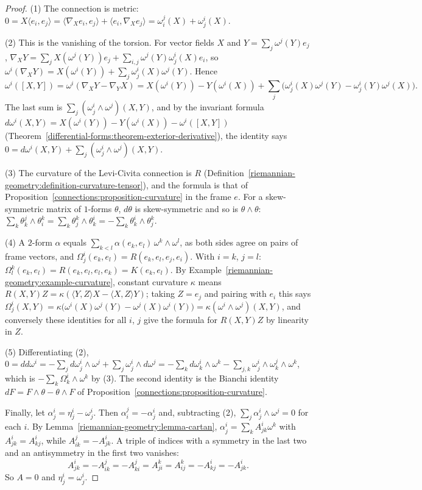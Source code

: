 \begin{proof}
(1) The connection is metric: $0 = X\langle e_i, e_j\rangle = \langle\nabla_Xe_i, e_j\rangle + \langle e_i, \nabla_Xe_j\rangle = \omega^j_i(X) + \omega^i_j(X)$.

(2) This is the vanishing of the torsion. For vector fields $X$ and $Y = \sum_j\omega^j(Y)e_j$,
$\nabla_XY = \sum_jX(\omega^j(Y))e_j + \sum_{i,j}\omega^j(Y)\omega^i_j(X)e_i$, so $\omega^i(\nabla_XY) = X(\omega^i(Y)) + \sum_j\omega^i_j(X)\omega^j(Y)$. Hence
\[
\omega^i([X, Y]) = \omega^i(\nabla_XY - \nabla_YX) = X(\omega^i(Y)) - Y(\omega^i(X)) + \sum_j\bigl(\omega^i_j(X)\omega^j(Y) - \omega^i_j(Y)\omega^j(X)\bigr).
\]
The last sum is $\sum_j(\omega^i_j \wedge \omega^j)(X, Y)$, and by the invariant formula $d\omega^i(X, Y) = X(\omega^i(Y)) - Y(\omega^i(X)) - \omega^i([X, Y])$
(Theorem~\ref{differential-forms:theorem-exterior-derivative}), the identity says $0 = d\omega^i(X, Y) + \sum_j(\omega^i_j \wedge \omega^j)(X, Y)$.

(3) The curvature of the Levi-Civita connection is $R$ (Definition~\ref{riemannian-geometry:definition-curvature-tensor}), and the formula is that of
Proposition~\ref{connections:proposition-curvature} in the frame $e$. For a skew-symmetric matrix of $1$-forms $\theta$, $d\theta$ is skew-symmetric and so is $\theta \wedge \theta$:
$\sum_k\theta^j_k \wedge \theta^k_i = \sum_k\theta^k_j \wedge \theta^i_k = -\sum_k\theta^i_k \wedge \theta^k_j$.

(4) A $2$-form $\alpha$ equals $\sum_{k<l}\alpha(e_k, e_l)\,\omega^k \wedge \omega^l$, as both sides agree on pairs of frame vectors, and $\Omega^i_j(e_k, e_l) = R(e_k, e_l, e_j, e_i)$. With $i = k$,
$j = l$: $\Omega^k_l(e_k, e_l) = R(e_k, e_l, e_l, e_k) = K(e_k, e_l)$. By Example~\ref{riemannian-geometry:example-curvature}, constant curvature $\kappa$ means
$R(X, Y)Z = \kappa(\langle Y, Z\rangle X - \langle X, Z\rangle Y)$; taking $Z = e_j$ and pairing with $e_i$ this says
$\Omega^i_j(X, Y) = \kappa\bigl(\omega^i(X)\omega^j(Y) - \omega^j(X)\omega^i(Y)\bigr) = \kappa(\omega^i \wedge \omega^j)(X, Y)$, and conversely these identities for all $i$, $j$ give the formula for
$R(X, Y)Z$ by linearity in $Z$.

(5) Differentiating (2), $0 = dd\omega^i = -\sum_jd\omega^i_j \wedge \omega^j + \sum_j\omega^i_j \wedge d\omega^j = -\sum_kd\omega^i_k \wedge \omega^k - \sum_{j,k}\omega^i_j \wedge \omega^j_k \wedge \omega^k$,
which is $-\sum_k\Omega^i_k \wedge \omega^k$ by (3). The second identity is the Bianchi identity $dF = F \wedge \theta - \theta \wedge F$ of Proposition~\ref{connections:proposition-curvature}.

Finally, let $\alpha^i_j = \eta^i_j - \omega^i_j$. Then $\alpha^j_i = -\alpha^i_j$ and, subtracting (2), $\sum_j\alpha^i_j \wedge \omega^j = 0$ for each $i$. By Lemma~\ref{riemannian-geometry:lemma-cartan},
$\alpha^i_j = \sum_kA^i_{jk}\omega^k$ with $A^i_{jk} = A^i_{kj}$, while $A^j_{ik} = -A^i_{jk}$. A triple of indices with a symmetry in the last two and an antisymmetry in the first two vanishes:
\[
A^i_{jk} = -A^j_{ik} = -A^j_{ki} = A^k_{ji} = A^k_{ij} = -A^i_{kj} = -A^i_{jk} .
\]
So $A = 0$ and $\eta^i_j = \omega^i_j$.
\end{proof}

